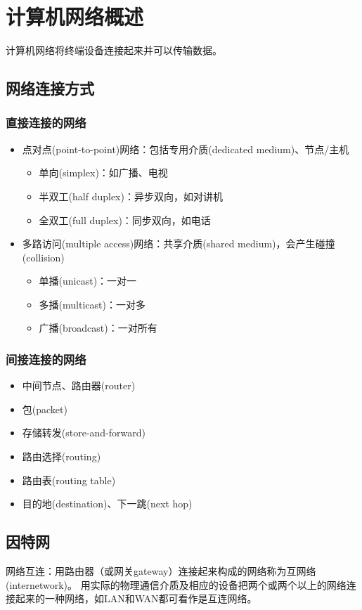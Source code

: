 
\section{计算机网络概述}
计算机网络将终端设备连接起来并可以传输数据。

\subsection{网络连接方式}
\subsubsection{直接连接的网络}
\begin{itemize}
\item 点对点(point-to-point)网络：包括专用介质(dedicated medium)、节点/主机
\begin{itemize}
	\item 单向(simplex)：如广播、电视
	\item 半双工(half duplex)：异步双向，如对讲机
	\item 全双工(full duplex)：同步双向，如电话
\end{itemize}
\item 多路访问(multiple access)网络：共享介质(shared medium)，会产生碰撞(collision)
\begin{itemize}
	\item 单播(unicast)：一对一
	\item 多播(multicast)：一对多
	\item 广播(broadcast)：一对所有
\end{itemize}
\end{itemize}

\subsubsection{间接连接的网络}
\begin{itemize}
	\item 中间节点、路由器(router)
	\item 包(packet)
	\item 存储转发(store-and-forward)
	\item 路由选择(routing)
	\item 路由表(routing table)
	\item 目的地(destination)、下一跳(next hop)
\end{itemize}

\subsection{因特网}
网络互连：用路由器（或网关gateway）连接起来构成的网络称为互网络(internetwork)。
用实际的物理通信介质及相应的设备把两个或两个以上的网络连接起来的一种网络，如LAN和WAN都可看作是互连网络。

